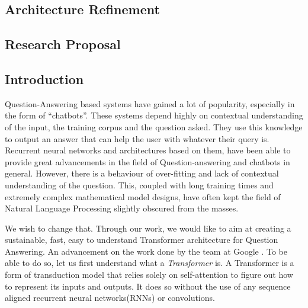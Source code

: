 \documentclass[12pt]{report}
\begin{document}
        \section{Architecture Refinement}\label{c43}
    \begin{appendices}
        \chapter{Research Proposal}\label{rp}
        	\section{Introduction}\label{introduction}

        Question-Answering based systems have gained a lot of popularity, especially in the form of ``chatbots''. These systems depend highly on contextual understanding of the input, the training corpus and the question asked. They use this knowledge to output an answer that can help the user with whatever their query is. Recurrent neural networks and architectures based on them, have been able to provide great advancements in the field of Question-answering and chatbots in general. However, there is a behaviour of over-fitting and lack of contextual understanding of the question. This, coupled with long training times and extremely complex mathematical model designs, have often kept the field of Natural Language Processing slightly obscured from the masses.

        We wish to change that. Through our work, we would like to aim at creating a sustainable, fast, easy to understand Transformer architecture for Question Answering. An advancement on the work done by the team at Google \citep{atayl}. To be able to do so, let us first understand what a \textit{Transformer} is.
        A Transformer is a form of transduction model that relies solely on self-attention to figure out how to represent its inputs and outputs. It does so without the use of any sequence aligned recurrent neural networks(RNNs) or convolutions.


\end{appendices}
\end{document}
